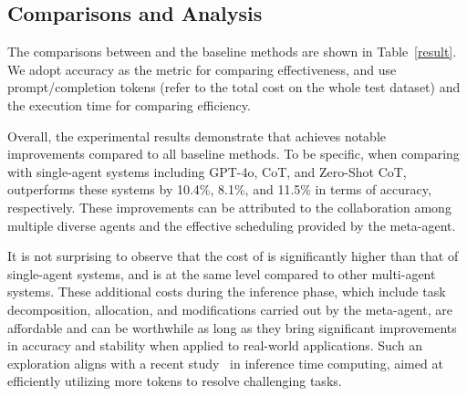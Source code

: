 \begin{table}[!t]
\centering
\caption{Comparisons between \name and baselines.}
\label{result}
\end{table}

\subsection{Comparisons and Analysis}
\label{subsec:exp_comparisons}

The comparisons between \name and the baseline methods are shown in Table~\ref{result}. We adopt accuracy as the metric for comparing effectiveness, and use prompt/completion tokens (refer to the total cost on the whole test dataset) and the execution time for comparing efficiency.

Overall, the experimental results demonstrate that \name achieves notable improvements compared to all baseline methods. To be specific, when comparing with single-agent systems including GPT-4o, CoT, and Zero-Shot CoT, \name outperforms these systems by 10.4\%, 8.1\%, and 11.5\% in terms of accuracy, respectively. These improvements can be attributed to the collaboration among multiple diverse agents and the effective scheduling provided by the meta-agent. 

It is not surprising to observe that the cost of \name is significantly higher than that of single-agent systems, and is at the same level compared to other multi-agent systems. These additional costs during the inference phase, which include task decomposition, allocation, and modifications carried out by the meta-agent, are affordable and can be worthwhile as long as they bring significant improvements in accuracy and stability when applied to real-world applications. Such an exploration aligns with a recent study~\citep{ openai20244o} in inference time computing, aimed at efficiently utilizing more tokens to resolve challenging tasks.


